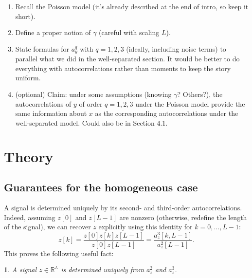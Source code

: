 \documentclass[12pt]{article}
\newcommand{\1}{\mathbf{1}}
\newcommand{\TODO}[1]{{\color{red}{[#1]}}}
\newcommand{\RL}{\mathbb{R}^L}
\theoremstyle{plain}
\theoremstyle{definition}
\theoremstyle{remark}
\theoremstyle{plain}
\theoremstyle{remark}
\theoremstyle{plain}
\theoremstyle{plain}
\theoremstyle{plain}
\newtheorem{proposition}[thm]{\protect\propositionname}
\providecommand{\propositionname}{Proposition}
\numberwithin{equation}{section}
\begin{document}
\TODO{What we want to have in this section}
\begin{enumerate}
	\item Recall the Poisson model (it's already described at the end of intro, so keep it short).
	\item Define a proper notion of $\gamma$ (careful with scaling $L$).
	\item State formulas for $a_y^q$ with $q = 1, 2, 3$ (ideally, including noise terms) to parallel what we did in the well-separated section. It would be better to do everything with autocorrelations rather than moments to keep the story uniform.
	\item (optional) Claim: under some assumptions (knowing $\gamma$? Others?), the autocorrelations of $y$ of order $q = 1, 2, 3$ under the Poisson model provide the same information about $x$ as the corresponding autocorrelations under the well-separated model. Could also be in Section 4.1.
\end{enumerate}


\section{Theory}

\TODO{Explain difference between homogeneous and heterogeneous}

\subsection{Guarantees for the homogeneous case} \label{sec:theory_homogeneous}
 
A signal is determined uniquely by its second- and third-order autocorrelations. Indeed, assuming $z[0]$ and $z[L-1]$ are nonzero (otherwise, redefine the length of the signal), we can recover $z$ explicitly using this identity for $k = 0, \ldots, L-1$:
%
\begin{equation}
%
z[k]  = \frac{z[0]z[k]z[L-1]}{z[0]z[L-1]} = \frac{a_z^3[k,L-1]}{a_z^2[L-1]}.
\label{eq-uniqueness}
%
\end{equation}
This proves the following useful fact:
\begin{proposition} \label{prop:uniqueness}
	A signal $z\in\RL$ is determined uniquely from  $a_z^2$ and $a_z^3$. \TODO{Definitely only clear for the homogeneous case}
\end{proposition}
\end{document}
